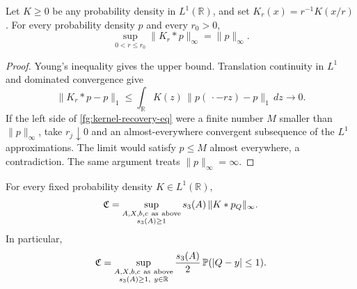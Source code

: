 \begin{lemma}\label{fg:kernel-recovery}
Let $K\geq0$ be any probability density in $L^1(\mathbb R)$,
and set $K_r(x)=r^{-1}K(x/r)$.  For every probability
density $p$ and every $r_0>0$,
\begin{equation}\label{fg:kernel-recovery-eq}
 \sup_{0<r\leq r_0}\|K_r*p\|_\infty=\|p\|_\infty .
\end{equation}
\end{lemma}
\begin{proof}
Young's inequality gives the upper bound.
Translation continuity in $L^1$ and dominated convergence
give
\[
 \|K_r*p-p\|_1
 \leq\int_{\mathbb R}K(z)\,
           \|p(\,\cdot-rz)-p\|_1\,dz\longrightarrow0 .
\]
If the left side of \eqref{fg:kernel-recovery-eq} were a
finite number $M$ smaller than $\|p\|_\infty$, take
$r_j\downarrow0$ and an almost-everywhere convergent
subsequence of the $L^1$ approximations.
The limit would satisfy $p\leq M$ almost everywhere,
a contradiction.  The same argument treats
$\|p\|_\infty=\infty$.
\end{proof}

\begin{theorem}
\label{fg:fixed-kernel}
For every fixed probability density $K\in L^1(\mathbb R)$,
\begin{equation}\label{fg:fixed-kernel-eq}
 \mathfrak C
 =\sup_{\substack{A,X,b,c\ {\rm as\ above}\\s_3(A)\geq1}}
       s_3(A)\,\|K*p_Q\|_\infty .
\end{equation}
In particular,
\begin{equation}\label{fg:fixed-box-eq}
 \mathfrak C
 =\sup_{\substack{A,X,b,c\ {\rm as\ above}\\s_3(A)\geq1,\ y\in\mathbb R}}
       \frac{s_3(A)}2\,\mathbb P(|Q-y|\leq1).
\end{equation}
\end{theorem}


